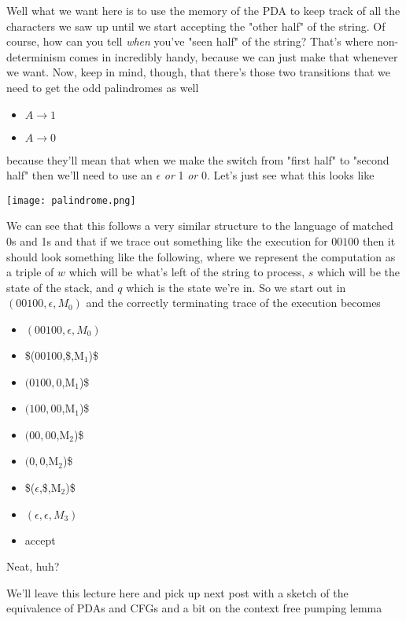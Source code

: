 \documentclass[11pt]{article}
\begin{document}
Well what we want here is to use the memory of the PDA to keep track of all the characters we saw up until we start accepting the "other half" of the string. Of course, how can you tell \emph{when} you've "seen half" of the string? That's where non-determinism comes in incredibly handy, because we can just make that whenever we want. Now, keep in mind, though, that there's those two transitions that we need to get the odd palindromes as well

\begin{itemize}
\item $A \to 1$
\item $A \to 0$
\end{itemize}

because they'll mean that when we make the switch from "first half" to "second half" then we'll need to use an $\epsilon$ \emph{or} 1 \emph{or} 0. Let's just see what this looks like

\texttt{[image: palindrome.png]}

We can see that this follows a very similar structure to the language of matched 0s and 1s and that if we trace out something like the execution for $00100$ then it should look something like the following, where we represent the computation as a triple of $w$ which will be what's left of the string to process, $s$ which will be the state of the stack, and $q$ which is the state we're in. So we start out in $(00100,\epsilon,M_0)$ and the correctly terminating trace of the execution becomes

\begin{itemize}
\item $(00100,\epsilon,M_0)$
\item \$(00100,\$,M$_{\text{1}}$)\$
\item $(0100,0$,M$_{\text{1}}$)\$
\item $(100,00$,M$_{\text{1}}$)\$
\item $(00,00$,M$_{\text{2}}$)\$
\item $(0,0$,M$_{\text{2}}$)\$
\item \$($\epsilon$,\$,M$_{\text{2}}$)\$
\item $(\epsilon,\epsilon,M_3)$
\item accept
\end{itemize}

Neat, huh?

We'll leave this lecture here and pick up next post with a sketch of the equivalence of PDAs and CFGs and a bit on the context free pumping lemma
\end{document}
